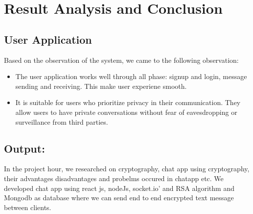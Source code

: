 \chapter{Result Analysis and Conclusion}

\section{User Application}
Based on the observation of the system, we came to the following observation:
\vspace{-18pt}
\begin{itemize}
	\item The user application works well through all phase: signup and login, message sending and receiving. This make user experiene smooth.
	\item It is suitable for users who prioritize privacy in their communication. They allow users to have private conversations without fear of eavesdropping or surveillance from third parties.
\end{itemize}

\section{ Output:}
In the project hour, we researched on cryptography, chat app using cryptography, their advantages
disadvantages and probelms occured in chatapp etc. We developed chat app using react js, nodeJs, socket.io’
and RSA algorithm and Mongodb as database where we can send end to end encrypted text message between clients.



